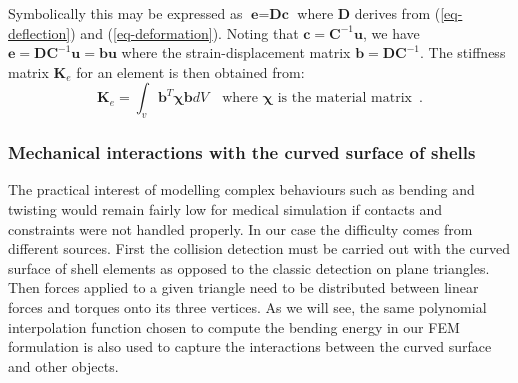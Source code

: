 \documentclass{llncs}
\begin{document}
Symbolically this may be expressed as $\textbf{e} = \textbf{Dc}$ where $\textbf{D}$ derives from (\ref{eq-deflection}) and (\ref{eq-deformation}). Noting that $\textbf{c} = \textbf{C}^{-1}\textbf{u}$, we have $\textbf{e} = \textbf{DC}^{-1}\textbf{u} = \textbf{bu}$ where the strain-displacement matrix $\textbf{b} = \textbf{DC}^{-1}$. 
The stiffness matrix $\textbf{K}_e$ for an element is then obtained from:
\begin{equation}
\textbf{K}_e = \int_v \textbf{b}^{T} \boldsymbol\chi \textbf{b} dV \quad
\mbox{where } \boldsymbol\chi \mbox{ is the material matrix} \enspace .
\end{equation} 

\subsubsection{Mechanical interactions with the curved surface of shells}
\label{sec:interactions}
The practical interest of modelling complex behaviours such as bending and twisting would remain fairly low for medical simulation if contacts and constraints were not handled properly. In our case the difficulty comes from different sources. First the collision detection must be carried out with the curved surface of shell elements as opposed to the classic detection on plane triangles. Then forces applied to a given triangle need to be distributed between linear forces and torques onto its three vertices. As we will see, the same polynomial interpolation function chosen to compute the bending energy in our FEM formulation is also used to capture the interactions between the curved surface and other objects. 
\end{document}
